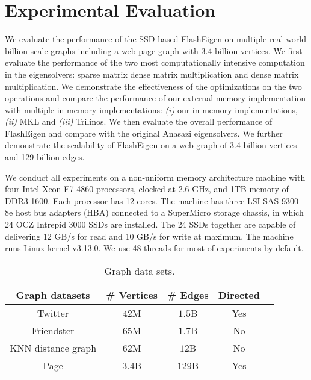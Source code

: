 \section{Experimental Evaluation}

We evaluate the performance of the SSD-based FlashEigen on multiple real-world
billion-scale graphs including a web-page graph with 3.4 billion vertices.
We first evaluate the performance
of the two most computationally intensive computation in the eigensolvers:
sparse matrix dense matrix multiplication and dense matrix multiplication.
We demonstrate the effectiveness of the optimizations on the two operations
and compare the performance of our external-memory implementation with
multiple in-memory implementations: \textit{(i)} our in-memory implementations,
\textit{(ii)} MKL and \textit{(iii)} Trilinos. We then evaluate the overall
performance of FlashEigen and compare with the original Anasazi eigensolvers.
We further demonstrate the scalability
of FlashEigen on a web graph of 3.4 billion vertices and 129 billion edges.

We conduct all experiments on a non-uniform memory architecture machine with
four Intel Xeon E7-4860 processors, clocked at 2.6 GHz, and 1TB memory of
DDR3-1600. Each processor has 12 cores. The machine has three LSI SAS 9300-8e
host bus adapters (HBA) connected to a SuperMicro storage chassis, in which
24 OCZ Intrepid 3000 SSDs are installed. The 24 SSDs together are capable of
delivering 12 GB/s for read and 10 GB/s for write at maximum. The machine runs
Linux kernel v3.13.0. We use 48 threads for most of experiments by default.

\begin{table}
\begin{center}
\footnotesize
\begin{tabular}{|c|c|c|c|c|}
\hline
Graph datasets & \# Vertices & \# Edges & Directed \\
\hline
Twitter \cite{twitter} & $42$M & $1.5$B & Yes \\
\hline
Friendster \cite{friendster} & $65$M & $1.7$B & No \\
\hline
KNN distance graph \cite{} & $62$M & $12$B & No \\
\hline
Page \cite{web_graph} & $3.4$B & $129$B & Yes \\
\hline
\end{tabular}
\normalsize
\end{center}
\vspace{-10pt}
\caption{Graph data sets.}
\label{graphs}
\end{table}

